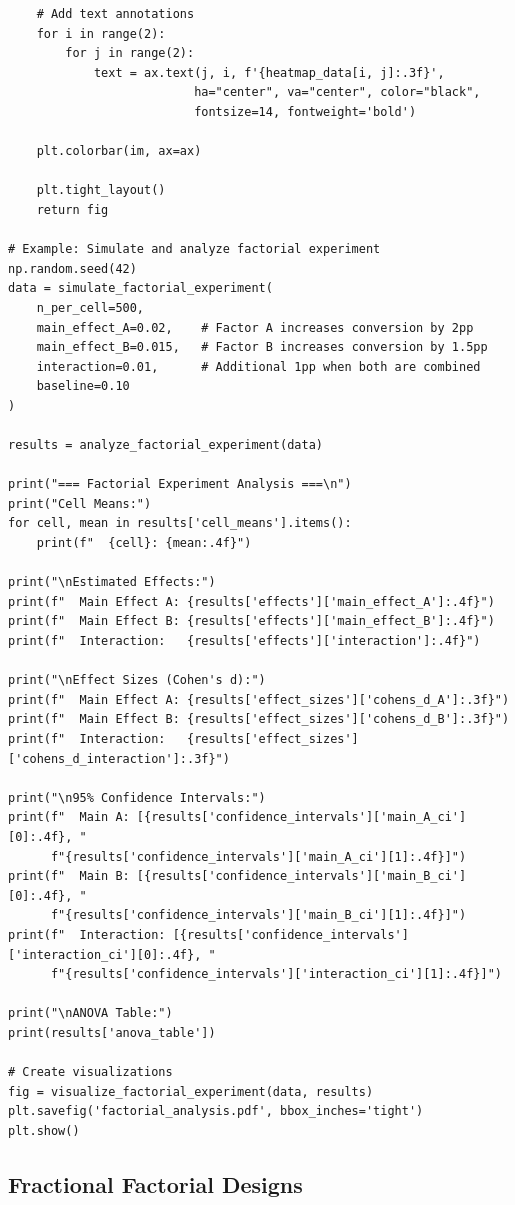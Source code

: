 \begin{lstlisting}
    # Add text annotations
    for i in range(2):
        for j in range(2):
            text = ax.text(j, i, f'{heatmap_data[i, j]:.3f}',
                          ha="center", va="center", color="black",
                          fontsize=14, fontweight='bold')

    plt.colorbar(im, ax=ax)

    plt.tight_layout()
    return fig

# Example: Simulate and analyze factorial experiment
np.random.seed(42)
data = simulate_factorial_experiment(
    n_per_cell=500,
    main_effect_A=0.02,    # Factor A increases conversion by 2pp
    main_effect_B=0.015,   # Factor B increases conversion by 1.5pp
    interaction=0.01,      # Additional 1pp when both are combined
    baseline=0.10
)

results = analyze_factorial_experiment(data)

print("=== Factorial Experiment Analysis ===\n")
print("Cell Means:")
for cell, mean in results['cell_means'].items():
    print(f"  {cell}: {mean:.4f}")

print("\nEstimated Effects:")
print(f"  Main Effect A: {results['effects']['main_effect_A']:.4f}")
print(f"  Main Effect B: {results['effects']['main_effect_B']:.4f}")
print(f"  Interaction:   {results['effects']['interaction']:.4f}")

print("\nEffect Sizes (Cohen's d):")
print(f"  Main Effect A: {results['effect_sizes']['cohens_d_A']:.3f}")
print(f"  Main Effect B: {results['effect_sizes']['cohens_d_B']:.3f}")
print(f"  Interaction:   {results['effect_sizes']['cohens_d_interaction']:.3f}")

print("\n95% Confidence Intervals:")
print(f"  Main A: [{results['confidence_intervals']['main_A_ci'][0]:.4f}, "
      f"{results['confidence_intervals']['main_A_ci'][1]:.4f}]")
print(f"  Main B: [{results['confidence_intervals']['main_B_ci'][0]:.4f}, "
      f"{results['confidence_intervals']['main_B_ci'][1]:.4f}]")
print(f"  Interaction: [{results['confidence_intervals']['interaction_ci'][0]:.4f}, "
      f"{results['confidence_intervals']['interaction_ci'][1]:.4f}]")

print("\nANOVA Table:")
print(results['anova_table'])

# Create visualizations
fig = visualize_factorial_experiment(data, results)
plt.savefig('factorial_analysis.pdf', bbox_inches='tight')
plt.show()
\end{lstlisting}

\subsection{Fractional Factorial Designs}

